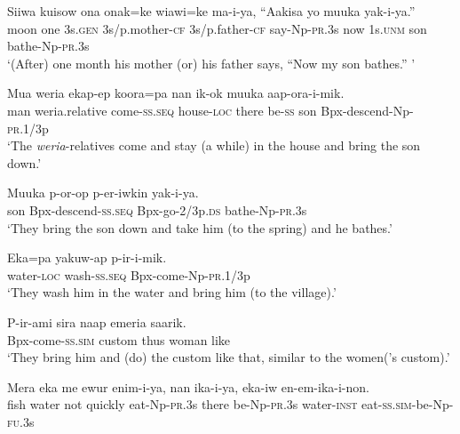 \ea\label{ex:a:x31}
\gll  Siiwa  kuisow  ona  onak=ke  wiawi=ke  ma-i-ya,  “Aakisa        yo  muuka  yak-i-ya.” \\
moon  one  3s.\textsc{gen}  3s/p.mother-\textsc{cf}  3s/p.father-\textsc{cf}  say-Np-\textsc{pr}.3s  now  1s.\textsc{unm}  son  bathe-Np-\textsc{pr}.3s \\


\glt ‘(After) one month his mother (or) his father says, “Now my son bathes.” ’ \\
\z


\ea\label{ex:a:x32}
\gll  Mua  weria  ekap-ep  koora=pa  nan  ik-ok  muuka         aap-ora-i-mik. \\
man  weria.relative  come-\textsc{ss.seq}  house-\textsc{loc}  there  be-\textsc{ss}  son Bpx-descend-Np-\textsc{pr}.1/3p \\


\glt ‘The \textit{weria}{}-relatives come and stay (a while) in the house and bring the son down.’ \\
\z


\ea\label{ex:a:x33}
\gll  Muuka  p-or-op  p-er-iwkin  yak-i-ya. \\
son  Bpx-descend-\textsc{ss.seq}  Bpx-go-2/3p.\textsc{ds}  bathe-Np-\textsc{pr}.3s \\
\glt ‘They bring the son down and take him (to the spring) and he bathes.’ \\
\z


\ea\label{ex:a:x34}
\gll  Eka=pa  yakuw-ap  p-ir-i-mik. \\
water-\textsc{loc}  wash-\textsc{ss.seq}  Bpx-come-Np-\textsc{pr}.1/3p \\
\glt ‘They wash him in the water and bring him (to the village).’ \\
\z


\ea\label{ex:a:x35}
\gll  P-ir-ami  sira  naap  emeria  saarik. \\
Bpx-come-\textsc{ss}.\textsc{sim}  custom  thus  woman  like \\
\glt ‘They bring him and (do) the custom like that, similar to the women(’s custom).’ \\
\z


\ea\label{ex:a:x36}
\gll  Mera  eka  me  ewur  enim-i-ya,  nan  ika-i-ya,  eka-iw           en-em-ika-i-non. \\
fish  water  not  quickly  eat-Np-\textsc{pr}.3s  there  be-Np-\textsc{pr}.3s  water-\textsc{inst} eat-\textsc{ss}.\textsc{sim}-be-Np-\textsc{fu}.3s \\


